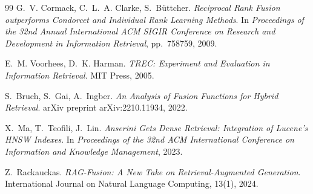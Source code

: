 \documentclass[runningheads,a4paper]{llncs}
\begin{document}
\begin{thebibliography}{99}
G.~V. Cormack, C.~L.~A. Clarke, S.~B{\"u}ttcher.
\newblock \textit{Reciprocal Rank Fusion outperforms Condorcet and Individual Rank Learning Methods}.
\newblock In \textit{Proceedings of the 32nd Annual International ACM SIGIR Conference on Research and Development in Information Retrieval}, pp.~758\textendash{}759, 2009.

E.~M. Voorhees, D.~K. Harman.
\newblock \textit{TREC: Experiment and Evaluation in Information Retrieval}.
\newblock MIT Press, 2005.

S.~Bruch, S.~Gai, A.~Ingber.
\newblock \textit{An Analysis of Fusion Functions for Hybrid Retrieval}.
\newblock arXiv preprint arXiv:2210.11934, 2022.

X.~Ma, T.~Teofili, J.~Lin.
\newblock \textit{Anserini Gets Dense Retrieval: Integration of Lucene's HNSW Indexes}.
\newblock In \textit{Proceedings of the 32nd ACM International Conference on Information and Knowledge Management}, 2023.

Z.~Rackauckas.
\newblock \textit{RAG-Fusion: A New Take on Retrieval-Augmented Generation}.
\newblock International Journal on Natural Language Computing, 13(1), 2024.


\end{thebibliography}

\clearpage

\end{document}
